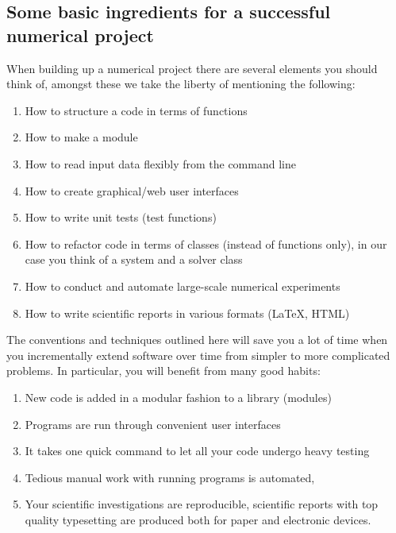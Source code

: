 \documentclass[%
twoside,                 %
final,                   %
10pt]{article}
\begin{document}
\subsection{Some basic ingredients for a successful numerical project}

When building up a numerical project there are several elements you should think of, amongst these we take the liberty of mentioning the following:
\begin{enumerate}
  \item How to structure a code in terms of functions

  \item How to make a module

  \item How to read input data flexibly from the command line

  \item How to create graphical/web user interfaces

  \item How to write unit tests (test functions)

  \item How to refactor code in terms of classes (instead of functions only), in our case you think of a system and a solver class

  \item How to conduct and automate large-scale numerical experiments

  \item How to write scientific reports in various formats ({\LaTeX}, HTML)
\end{enumerate}

\noindent
The conventions and techniques outlined here will save you a lot of time when you incrementally extend software over time from simpler to more complicated problems. In particular, you will benefit from many good habits:
\begin{enumerate}
\item New code is added in a modular fashion to a library (modules)

\item Programs are run through convenient user interfaces

\item It takes one quick command to let all your code undergo heavy testing 

\item Tedious manual work with running programs is automated,

\item Your scientific investigations are reproducible, scientific reports with top quality typesetting are produced both for paper and electronic devices.
\end{enumerate}
\end{document}
